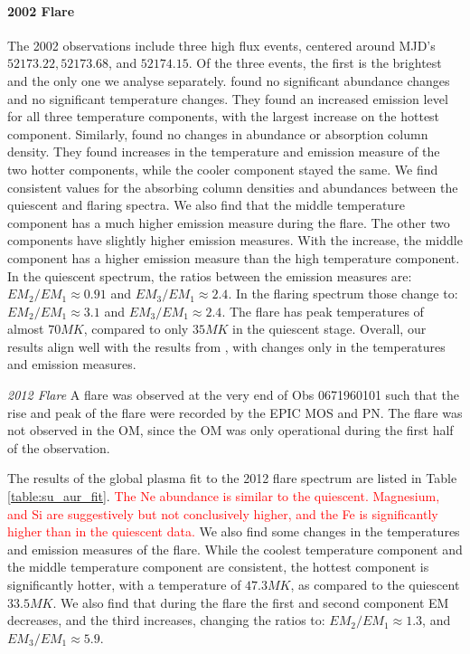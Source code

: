 \documentclass[twocolumn]{aastex631}
\newcommand{\red}[1]{\textcolor{red}{#1}}
\begin{document}
\paragraph{2002 Flare}
The 2002 observations include three high flux events, centered around MJD's $52173.22, 52173.68$, and $52174.15$. Of the three events, the first is the brightest and the only one we analyse separately.
\citet{robrade_xmm-newton_2006}  found no significant abundance changes and no significant temperature changes. They found an increased emission level for all three temperature components, with the largest increase on the hottest component.
Similarly, \citet{franciosini_xmm-newton_2007} found no changes in abundance or absorption column density. They found increases in the temperature and emission measure of the two hotter components, while the cooler component stayed the same.
We find consistent values for the absorbing column densities and abundances between the quiescent and flaring spectra. 
We also find that the middle temperature component has a much higher emission measure during the flare. The other two components have slightly higher emission measures. With the increase, the middle component has a higher emission measure than the high temperature component. In the quiescent spectrum, the ratios between the emission measures are: $EM_2/EM_1 \approx 0.91$ and $EM_3/EM_1 \approx 2.4$. In the flaring spectrum those change to: $EM_2/EM_1 \approx 3.1$ and $EM_3/EM_1 \approx 2.4$. 
The flare has peak temperatures of almost $70 MK$, compared to only $35 MK$ in the quiescent stage. Overall, our results align well with the results from \citet{franciosini_xmm-newton_2007}, with changes only in the temperatures and emission measures.

\textit{2012 Flare}
A flare was observed at the very end of Obs 0671960101 such that the rise and peak of the flare were recorded by the EPIC MOS and PN. The flare was not observed in the OM, since the OM was only operational during the first half of the observation.

The results of the global plasma fit to the 2012 flare spectrum are listed in Table \ref{table:su_aur_fit}.
\red{The Ne abundance is similar to the quiescent. Magnesium, and Si are suggestively but not conclusively higher, and the Fe is significantly higher than in the quiescent data.}
We also find some changes in the temperatures and emission measures of the flare.
While the coolest temperature component and the middle temperature component are consistent, the hottest component is significantly hotter, with a temperature of $47.3 MK$, as compared to the quiescent $33.5 MK$. We also find that during the flare the first and second component EM decreases, and the third increases, changing the ratios to: $EM_2/EM_1\approx1.3$, and $EM_3/EM_1\approx5.9$. 
\end{document}
